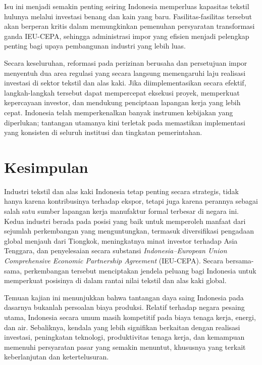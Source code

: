 \documentclass[
  manuscript=article,
  layout=publish,
  year=2026,
  volume=1,
]{den}
\begin{document}
Isu ini menjadi semakin penting seiring Indonesia memperluas kapasitas
tekstil hulunya melalui investasi benang dan kain yang baru.
Fasilitas-fasilitas tersebut akan berperan kritis dalam memungkinkan
pemenuhan persyaratan transformasi ganda IEU-CEPA, sehingga administrasi
impor yang efisien menjadi pelengkap penting bagi upaya pembangunan
industri yang lebih luas.

Secara keseluruhan, reformasi pada perizinan berusaha dan persetujuan
impor menyentuh dua area regulasi yang secara langsung memengaruhi laju
realisasi investasi di sektor tekstil dan alas kaki. Jika
diimplementasikan secara efektif, langkah-langkah tersebut dapat
mempercepat eksekusi proyek, memperkuat kepercayaan investor, dan
mendukung penciptaan lapangan kerja yang lebih cepat. Indonesia telah
memperkenalkan banyak instrumen kebijakan yang diperlukan; tantangan
utamanya kini terletak pada memastikan implementasi yang konsisten di
seluruh institusi dan tingkatan pemerintahan.

\section{Kesimpulan}\label{kesimpulan}

Industri tekstil dan alas kaki Indonesia tetap penting secara strategis,
tidak hanya karena kontribusinya terhadap ekspor, tetapi juga karena
perannya sebagai salah satu sumber lapangan kerja manufaktur formal
terbesar di negara ini. Kedua industri berada pada posisi yang baik
untuk memperoleh manfaat dari sejumlah perkembangan yang menguntungkan,
termasuk diversifikasi pengadaan global menjauh dari Tiongkok,
meningkatnya minat investor terhadap Asia Tenggara, dan penyelesaian
secara substansi \emph{Indonesia--European Union Comprehensive Economic
Partnership Agreement} (IEU-CEPA). Secara bersama-sama, perkembangan
tersebut menciptakan jendela peluang bagi Indonesia untuk memperkuat
posisinya di dalam rantai nilai tekstil dan alas kaki global.

Temuan kajian ini menunjukkan bahwa tantangan daya saing Indonesia pada
dasarnya bukanlah persoalan biaya produksi. Relatif terhadap negara
pesaing utama, Indonesia secara umum masih kompetitif pada biaya tenaga
kerja, energi, dan air. Sebaliknya, kendala yang lebih signifikan
berkaitan dengan realisasi investasi, peningkatan teknologi,
produktivitas tenaga kerja, dan kemampuan memenuhi persyaratan pasar
yang semakin menuntut, khususnya yang terkait keberlanjutan dan
ketertelusuran.
\end{document}
